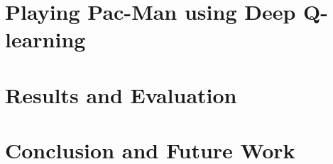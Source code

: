 \documentclass[12pt,twoside]{report}
\begin{document}
\chapter{Playing Pac-Man using Deep Q-learning} \label{chapter:practical}


\chapter{Results and Evaluation} \label{chapter:results}


\chapter{Conclusion and Future Work} \label{chapter:conclusion}



\end{document}
